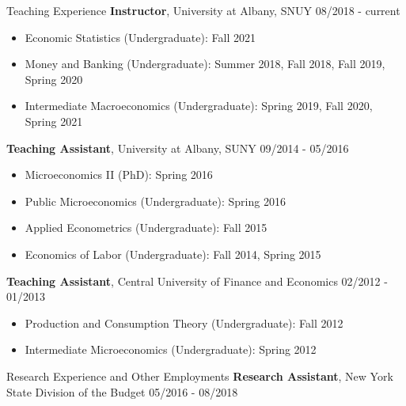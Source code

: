 \documentclass{resume_liang} %
\begin{document}
\begin{rSection}{Teaching Experience}
{\bf Instructor}{, University at Albany, SNUY} \hfill { 08/2018 - current}
 \begin{itemize}
 	 \item[] Economic Statistics (Undergraduate): Fall 2021
     \item[] Money and Banking (Undergraduate): Summer 2018, Fall 2018, Fall 2019, Spring 2020
     \item[] Intermediate Macroeconomics (Undergraduate): Spring 2019, Fall 2020, Spring 2021
 \end{itemize} 
{\bf Teaching Assistant}{, University at Albany, SUNY} \hfill { 09/2014 - 05/2016}
   \begin{itemize}
     \item[] Microeconomics II (PhD): Spring 2016
     \item[] Public Microeconomics (Undergraduate): Spring 2016
     \item[] Applied Econometrics (Undergraduate): Fall 2015
     \item[] Economics of Labor (Undergraduate): Fall 2014, Spring 2015
   \end{itemize} 
{\bf Teaching Assistant}{, Central University of Finance and Economics} \hfill { 02/2012 - 01/2013}
\begin{itemize}
	\item[] Production and Consumption Theory (Undergraduate): Fall 2012
	\item[] Intermediate Microeconomics (Undergraduate): Spring 2012 
\end{itemize} 
\end{rSection}
\bigskip \bigskip





\begin{rSection}{Research Experience and Other Employments}
	{\bf Research Assistant}{, New York State Division of the Budget} \hfill { 05/2016 - 08/2018}
\end{rSection}
\bigskip \bigskip
\end{document}
